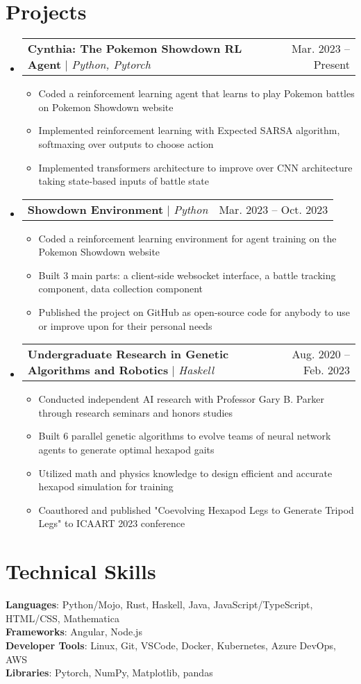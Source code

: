 \documentclass[letterpaper,11pt]{article}
\makeatletter
\newcommand{\resumeItem}[1]{
  \item\small{
    {#1 \vspace{-2pt}}
  }
}
\newcommand{\resumeProjectHeading}[2]{
    \item
    \begin{tabular*}{0.97\textwidth}{l@{\extracolsep{\fill}}r}
      #1 & #2 \\
    \end{tabular*}\vspace{-7pt}
}
\newcommand{\resumeSubHeadingListStart}{\begin{itemize}[leftmargin=0.15in, label={}]}
\newcommand{\resumeSubHeadingListEnd}{\end{itemize}}
\newcommand{\resumeItemListStart}{\begin{itemize}}
\newcommand{\resumeItemListEnd}{\end{itemize}\vspace{-5pt}}
\makeatother
\begin{document}
\section{Projects}
    \resumeSubHeadingListStart
      \resumeProjectHeading
          {\textbf{Cynthia: The Pokemon Showdown RL Agent} $|$ \emph{Python, Pytorch}}{Mar. 2023 -- Present}
          \resumeItemListStart
            \resumeItem{Coded a reinforcement learning agent that learns to play Pokemon battles on Pokemon Showdown website}
            \resumeItem{Implemented reinforcement learning with Expected SARSA algorithm, softmaxing over outputs to choose action}
            \resumeItem{Implemented transformers architecture to improve over CNN architecture taking state-based inputs of battle state}
          \resumeItemListEnd
      \resumeProjectHeading
          {\textbf{Showdown Environment} $|$ \emph{Python}}{Mar. 2023 -- Oct. 2023}
          \resumeItemListStart
            \resumeItem{Coded a reinforcement learning environment for agent training on the Pokemon Showdown website}
            \resumeItem{Built 3 main parts: a client-side websocket interface, a battle tracking component, data collection component}
            \resumeItem{Published the project on GitHub as open-source code for anybody to use or improve upon for their personal needs}
          \resumeItemListEnd
      \resumeProjectHeading
          {\textbf{Undergraduate Research in Genetic Algorithms and Robotics} $|$ \emph{Haskell}}{Aug. 2020 -- Feb. 2023}
          \resumeItemListStart
            \resumeItem{Conducted independent AI research with Professor Gary B. Parker through research seminars and honors studies}
            \resumeItem{Built 6 parallel genetic algorithms to evolve teams of neural network agents to generate optimal hexapod gaits}
            \resumeItem{Utilized math and physics knowledge to design efficient and accurate hexapod simulation for training}
            \resumeItem{Coauthored and published "Coevolving Hexapod Legs to Generate Tripod Legs" to ICAART 2023 conference}
          \resumeItemListEnd
    \resumeSubHeadingListEnd


\section{Technical Skills}
 \begin{itemize}[leftmargin=0.15in, label={}]
    \small{\item{
      \textbf{Languages}{: Python/Mojo, Rust, Haskell, Java, JavaScript/TypeScript, HTML/CSS, Mathematica} \\
      \textbf{Frameworks}{: Angular, Node.js} \\
      \textbf{Developer Tools}{: Linux, Git, VSCode, Docker, Kubernetes, Azure DevOps, AWS} \\
      \textbf{Libraries}{: Pytorch, NumPy, Matplotlib, pandas}
    }}
 \end{itemize}


\end{document}
